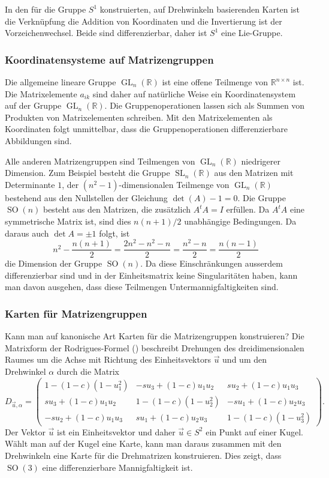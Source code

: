 In den für die Gruppe $S^1$ konstruierten, auf Drehwinkeln basierenden
Karten ist die Verknüpfung die
Addition von Koordinaten und die Invertierung ist der Vorzeichenwechsel.
Beide sind differenzierbar, daher ist $S^1$ eine Lie-Gruppe.

%
%
\subsubsection{Koordinatensysteme auf Matrizengruppen}
Die allgemeine lineare Gruppe $\operatorname{GL}_n(\mathbb{R})$
ist eine offene Teilmenge von $\mathbb{R}^{n\times n}$ ist.
Die Matrixelemente $a_{ik}$ sind daher auf natürliche Weise ein
Koordinatensystem auf der Gruppe $\operatorname{GL}_n(\mathbb{R})$.
Die Gruppenoperationen lassen sich als Summen von Produkten von
Matrixelementen schreiben.
Mit den Matrixelementen als Koordinaten folgt unmittelbar, dass
die Gruppenoperationen differenzierbare Abbildungen sind.

Alle anderen Matrizengruppen sind Teilmengen von
$\operatorname{GL}_n(\mathbb{R})$ niedrigerer Dimension.
Zum Beispiel besteht die Gruppe $\operatorname{SL}_n(\mathbb{R})$
aus den Matrizen mit Determinante $1$, der $(n^2-1)$-dimensionalen
Teilmenge von $\operatorname{GL}_n(\mathbb{R})$ bestehend aus
den Nullstellen der Gleichung $\det(A)-1=0$.
Die Gruppe $\operatorname{SO}(n)$ besteht aus den Matrizen, die
zusätzlich $A^tA=I$ erfüllen.
Da $A^tA$ eine symmetrische Matrix ist, sind dies
$n(n+1)/2$ unabhängige Bedingungen.
Da daraus auch $\det A=\pm1$ folgt, ist
\[
n^2 - \frac{n(n+1)}2
=
\frac{2n^2-n^2-n}{2}
=
\frac{n^2-n}2
=
\frac{n(n-1)}2
\]
die Dimension der Gruppe $\operatorname{SO}(n)$.
Da diese Einschränkungen ausserdem differenzierbar sind und in der
Einheitsmatrix keine Singularitäten haben, kann man davon ausgehen,
dass diese Teilmengen Untermannigfaltigkeiten sind.

%
%
\subsubsection{Karten für Matrizengruppen}
Kann man auf kanonische Art Karten für die Matrizengruppen
konstruieren?
Die Matrixform der Rodrigues-Formel (\cite[p.~438]{buch:linalg})
beschreibt Drehungen des dreidimensionalen Raumes um die Achse mit
Richtung des Einheitsvektors $\vec{u}$ und um den Drehwinkel $\alpha$
durch die Matrix
\[
D_{\vec{u},\alpha}
=
\begin{pmatrix}
 1-(1-c)(1-u_1^2) & -su_3+(1-c)u_1u_2 &  su_2+(1-c)u_1u_3 \\
 su_3+(1-c)u_1u_2 &  1-(1-c)(1-u_2^2) & -su_1+(1-c)u_2u_3 \\
-su_2+(1-c)u_1u_3 &  su_1+(1-c)u_2u_3 &  1-(1-c)(1-u_3^2) 
\end{pmatrix}.
\]
Der Vektor $\vec{u}$ ist ein Einheitsvektor und daher $\vec{u}\in S^2$
ein Punkt auf einer Kugel.
Wählt man auf der Kugel eine Karte, kann man daraus zusammen mit den
Drehwinkeln eine Karte für die Drehmatrizen konstruieren.
Dies zeigt, dass $\operatorname{SO}(3)$ eine differenzierbare
Mannigfaltigkeit ist.

